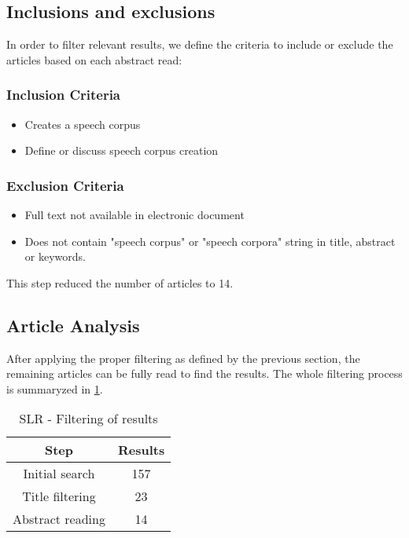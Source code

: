 \documentclass[conference]{IEEEtran}
\begin{document}
\subsection{Inclusions and exclusions}

In order to filter relevant results, we define the criteria to include or exclude the articles based on each abstract read:

\subsubsection{Inclusion Criteria}

\begin{itemize}
    \item Creates a speech corpus
    \item Define or discuss speech corpus creation
\end{itemize}

\subsubsection{Exclusion Criteria}

\begin{itemize}
    \item Full text not available in electronic document
    \item Does not contain "speech corpus" or "speech corpora" string in title, abstract or keywords.
\end{itemize}

This step reduced the number of articles to 14.

\subsection{Article Analysis}

After applying the proper filtering as defined by the previous section, the remaining articles can be fully read to find the results. The whole filtering process is summaryzed in \ref{tab:filtering}.

\begin{table}[h]
    \centering
    \begin{tabular}{|c|c|}
        \hline Step & Results \\ \hline
        Initial search & 157 \\ \hline
        Title filtering & 23 \\ \hline
        Abstract reading & 14 \\ \hline
    \end{tabular}
    \caption{SLR - Filtering of results}
    \label{tab:filtering}
\end{table}
\end{document}

